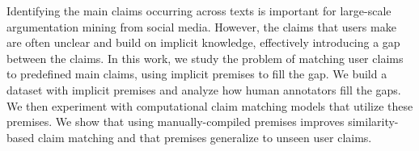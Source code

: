 Identifying the main claims occurring across texts is important for large-scale argumentation mining from social media. However, the claims that users make are often unclear and build on implicit knowledge, effectively introducing a gap between the claims.  In this work, we study the problem of matching user claims to predefined main claims, using implicit premises to fill the gap. We build a dataset with implicit premises and analyze how human annotators fill the gaps.  We then experiment with computational claim matching models that utilize these premises. We show that using manually-compiled premises improves similarity-based claim matching and that premises generalize to unseen user claims.
